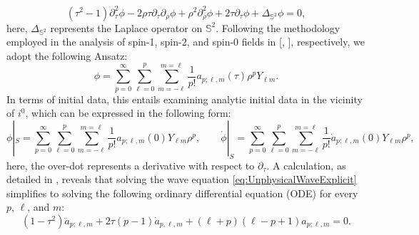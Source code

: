 \begin{equation}\label{eq:UnphysicalWaveExplicit}
  \left(\tau^2-1\right) \partial_\tau^2 \phi-2 \rho \tau \partial_\tau \partial_\rho \phi+\rho^2 \partial_\rho^2 \phi+2 \tau \partial_\tau \phi+\Delta_{\mathbb{S}^2} \phi=0,
\end{equation}
here, $\Delta _{\mathbb{S}^{2}{}}{}$ represents the Laplace operator on $\mathbb{S}^2$. Following the methodology employed in the analysis of spin-1, spin-2, and spin-0 fields in [\cite{ValAli22}, \cite{MinMacKro22}], respectively, we adopt the following Ansatz:
\begin{equation}\label{eq:ansatz}
	\phi = \sum_{p = 0}^{\infty}\sum_{\ell = 0}^{p}\sum_{m = -\ell}^{m = \ell}\frac{1}{p!}a_{p;\ell,m}(\tau)\rho^{p}Y_{\ell m}.
\end{equation}
In terms of initial data, this entails examining analytic initial data in the vicinity of $i^0$, which can be expressed in the following form:
\begin{equation}\label{eq:ID_field}
  \phi|_{{S}} =
  \sum_{p=0}^{\infty}
  \sum_{\ell=0}^{p}\sum_{m=-\ell}^{m=\ell}\frac{1}{p!}a_{p;\ell,m}(0)Y_{\ell
    m}\rho^p, \qquad \dot{\phi}|_{{S}} =
  \sum_{p=0}^{\infty}\sum_{\ell=0}^{p}\sum_{m=-\ell}^{m=\ell}
  \frac{1}{p!}\dot{a}_{p;\ell,m}(0)Y_{\ell
    m}\rho^p,
\end{equation}
here, the over-dot represents a derivative with respect to $\partial_\tau$. A calculation, as detailed in \cite{MinMacKro22}, reveals that solving the wave equation \eqref{eq:UnphysicalWaveExplicit} simplifies to solving the following ordinary differential equation (ODE) for every $p$, $\ell$, and $m$:
\begin{equation}\label{eq:ODE_wave_JacobiPoly}
  (1-\tau^2)\ddot{a}_{p;\ell,m} + 2\tau(p-1)\dot{a}_{p,\ell,m}+(\ell+p)(\ell-p+1){a}_{p;\ell,m}=0.
\end{equation}
